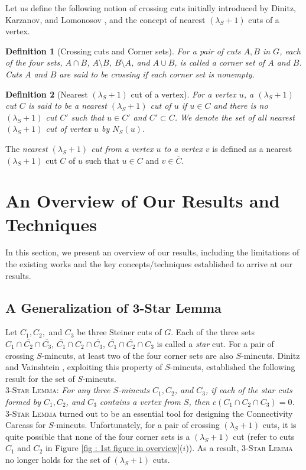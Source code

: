 \documentclass[letterpaper,11pt]{article}
\newtheorem{definition}{Definition}[]
\begin{document}
Let us define the following notion of crossing cuts initially introduced by Dinitz, Karzanov, and Lomonosov \cite{dinitz1976structure}, and the concept of nearest $(\lambda_S+1)$ cuts of a vertex. 
\begin{definition}[Crossing cuts and Corner sets]
    For a pair of cuts $A,B$ in $G$, each of the four sets, $A\cap B$, $A\setminus B$, $B\setminus A$, and $A\cup B$, is called a corner set of $A$ and $B$. Cuts $A$ and $B$ are said to be \textit{crossing} if each corner set is nonempty. 
\end{definition}
\begin{definition} [Nearest $(\lambda_S+1)$ cut of a vertex]  \label{def : nearest minimum+1 cut}
    For a vertex $u$, a $(\lambda_S+1)$ cut $C$ is said to be a nearest $(\lambda_S+1)$ cut of $u$ if $u\in C$ and there is no $(\lambda_S+1)$ cut $C'$ such that $u\in C'$ and $C'\subset C$. We denote the set of all nearest $(\lambda_S+1)$ cut of vertex $u$ by $N_S(u)$.
\end{definition}
   The \textit{nearest $(\lambda_S+1)$ cut from a vertex $u$ to a vertex $v$} is defined as a nearest $(\lambda_S+1)$ cut $C$ of $u$ such that $u\in C$ and $v\in \overline{C}$.


\section{An Overview of Our Results and Techniques} \label{sec : overview}
In this section, we present an overview of our results, including the limitations of the existing works and the key concepts/techniques established to arrive at our results.




\subsection{A Generalization of 3-Star Lemma}
Let $C_1,C_2,$ and $C_3$ be three Steiner cuts of $G$. Each of the three sets $C_1\cap \overline{C_2}\cap \overline{C_3}$, $\overline{C_1}\cap C_2 \cap \overline{C_3}$, $\overline{C_1}\cap \overline{C_2}\cap C_3$ is called a \textit{star} cut. For a pair of crossing $S$-mincuts, at least two of the four corner sets are also $S$-mincuts. 
Dinitz and Vainshtein \cite{DBLP:conf/stoc/DinitzV94, DBLP:conf/soda/DinitzV95, DBLP:journals/siamcomp/DinitzV00}, exploiting this property of $S$-mincuts, established the following result for the set of $S$-mincuts.  \\
\noindent
    \textsc{3-Star Lemma:} \textit{For any three $S$-mincuts $C_1,C_2$, and $C_3$, if each of the star cuts formed by $C_1,C_2$, and $C_3$ contains a vertex from $S$, then $c(C_1\cap C_2\cap C_3)=0$.}\\
\noindent
\textsc{3-Star Lemma} turned out to be an essential tool for designing the Connectivity Carcass \cite{DBLP:conf/stoc/DinitzV94, DBLP:conf/soda/DinitzV95, DBLP:journals/siamcomp/DinitzV00} for $S$-mincuts. Unfortunately, for a pair of crossing $(\lambda_S+1)$ cuts, it is quite possible that none of the four corner sets is a $(\lambda_S+1)$ cut (refer to cuts $C_1$ and $C_2$ in Figure \ref{fig : 1st figure in overview}($i$)).
As a result, \textsc{3-Star Lemma} no longer holds for the set of $(\lambda_S+1)$ cuts. 
\end{document}
